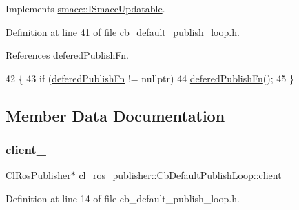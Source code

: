 Implements \hyperlink{classsmacc_1_1ISmaccUpdatable_a84ee0520cbefdb1d412bed54650b028e}{smacc\+::\+I\+Smacc\+Updatable}.



Definition at line 41 of file cb\+\_\+default\+\_\+publish\+\_\+loop.\+h.



References defered\+Publish\+Fn.


\begin{DoxyCode}
42     \{
43         \textcolor{keywordflow}{if} (\hyperlink{classcl__ros__publisher_1_1CbDefaultPublishLoop_ac0044704637edbd8f79a69d5b06de9ba}{deferedPublishFn} != \textcolor{keyword}{nullptr})
44             \hyperlink{classcl__ros__publisher_1_1CbDefaultPublishLoop_ac0044704637edbd8f79a69d5b06de9ba}{deferedPublishFn}();
45     \}
\end{DoxyCode}


\subsection{Member Data Documentation}
\mbox{\label{classcl__ros__publisher_1_1CbDefaultPublishLoop_a483b8c34b88dadc718fbf4bf1f95acb5}} 
\subsubsection{\texorpdfstring{client\+\_\+}{client\_}}
{\footnotesize\ttfamily \hyperlink{classcl__ros__publisher_1_1ClRosPublisher}{Cl\+Ros\+Publisher}$\ast$ cl\+\_\+ros\+\_\+publisher\+::\+Cb\+Default\+Publish\+Loop\+::client\+\_\+\hspace{0.3cm}{\ttfamily [private]}}



Definition at line 14 of file cb\+\_\+default\+\_\+publish\+\_\+loop.\+h.

\mbox{\label{classcl__ros__publisher_1_1CbDefaultPublishLoop_ac0044704637edbd8f79a69d5b06de9ba}} 
